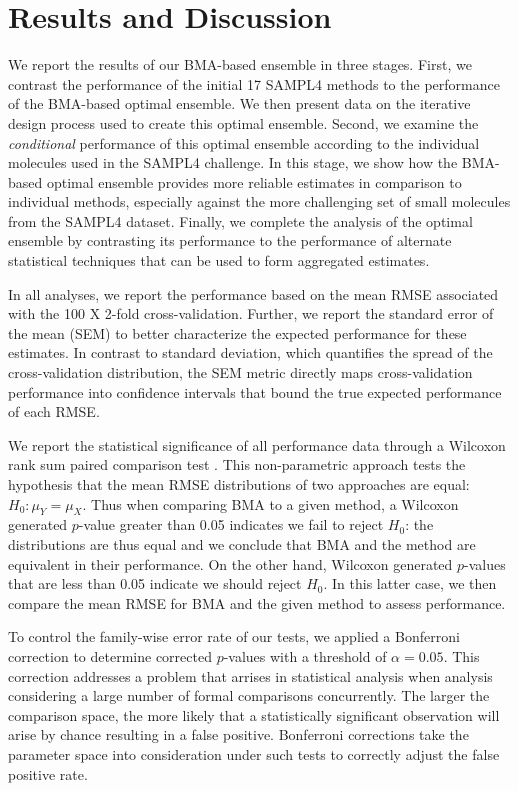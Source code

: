 \documentclass[journal=jpcbfk, manuscript=article]{achemso}
\newcommand{\+}[1]{\ensuremath{\mathbf{#1}}}
\begin{document}
\section{Results and Discussion} \label{Results}
We report the results of our BMA-based ensemble in three stages.
First, we contrast the performance of the initial 17 SAMPL4 methods to the performance of the BMA-based optimal ensemble.
We then present data on the iterative design process used to create this optimal ensemble.
Second, we examine the \emph{conditional} performance of this optimal ensemble according to the individual molecules used in the SAMPL4 challenge.
In this stage, we show how the BMA-based optimal ensemble provides more reliable estimates in comparison to individual methods, especially against the more challenging set of small molecules from the SAMPL4 dataset.
Finally, we complete the analysis of the optimal ensemble by contrasting its performance to the performance of alternate statistical techniques that can be used to form aggregated estimates. 

In all analyses, we report the performance based on the mean RMSE associated with the 100 X 2-fold cross-validation. 
Further, we report the standard error of the mean (SEM) to better characterize the expected performance for these estimates. 
In contrast to standard deviation, which quantifies the spread of the cross-validation distribution, the SEM metric directly maps cross-validation performance into confidence intervals that bound the true expected performance of each RMSE. 
 
We report the statistical significance of all performance data through a Wilcoxon rank sum paired comparison test \cite{Wilcoxon:45}.
This non-parametric approach tests the hypothesis that the mean RMSE distributions of two approaches are equal: $H_0 : \mu_Y = \mu_X$.
Thus when comparing BMA to a given method, a Wilcoxon generated $p$-value greater than 0.05 indicates we fail to reject $H_0$: the distributions are thus equal and we conclude that BMA and the method are equivalent in their performance.
On the other hand, Wilcoxon generated $p$-values that are less than 0.05 indicate we should reject $H_0$.
In this latter case, we then compare the mean RMSE for BMA and the given method to assess performance.

To control the family-wise error rate of our tests, we applied a Bonferroni correction to determine corrected $p$-values with a threshold of $\alpha = 0.05$.
This correction addresses a problem that arrises in statistical analysis when analysis considering a large number of formal comparisons concurrently.
The larger the comparison space, the more likely that a statistically significant observation will arise by chance resulting in a false positive.
Bonferroni corrections take the parameter space into consideration under such tests to correctly adjust the false positive rate.
\end{document}
